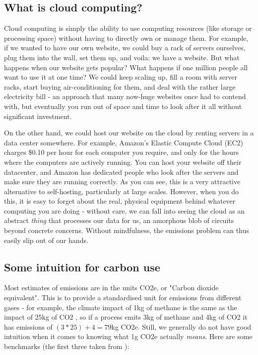\documentclass{article}
\begin{document}
\subsection{What is cloud computing?}
Cloud computing is simply the ability to use computing resources (like storage or processing space) without having to directly own or manage them. For example, if we wanted to have our own website, we could buy a rack of servers ourselves, plug them into the wall, set them up, and voila: we have a website. But what happens when our website gets popular? What happens if one million people all want to use it at one time? We could keep scaling up, fill a room with server racks, start buying air-conditioning for them, and deal with the rather large electricity bill - an approach that many now-huge websites once had to contend with, but eventually you run out of space and time to look after it all without significant investment. \newline

On the other hand, we could host our website on the cloud by renting servers in a data center somewhere. For example, Amazon's Elastic Compute Cloud (EC2) charges \$0.10 per hour for each computer you require, and only for the hours where the computers are actively running. You can host your website off their datacenter, and Amazon has dedicated people who look after the servers and make sure they are running correctly. As you can see, this is a very attractive alternative to self-hosting, particularly at large scales. However, when you do this, it is easy to forget about the real, physical equipment behind whatever computing you are doing - without care, we can fall into seeing the cloud as an abstract \emph{thing} that processes our data for us, an amorphous blob of circuits beyond concrete concerns. Without mindfulness, the emissions problem can thus easily slip out of our hands. 


\subsection{Some intuition for carbon use}
Most estimates of emissions are in the units CO2e, or "Carbon dioxide equivalent". This is to provide a standardised unit for emissions from different gases - for example, the climate impact of 1kg of methane is the same as the impact of 25kg of CO2 \citep{forster2007changes}, so if a process emits 3kg of methane and 4kg of CO2 it has emissions of $(3*25)+4=79$kg CO2e. Still, we generally do not have good intuition when it comes to knowing what 1g CO2e actually \emph{means}. Here are some benchmarks (the first three taken from \citet{lannelongue2021ten}):
\end{document}
